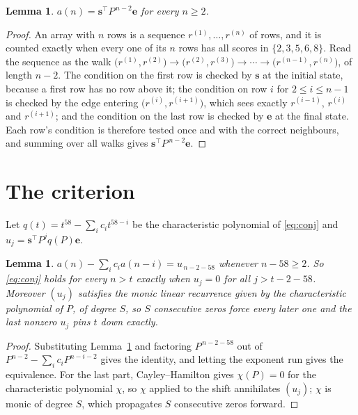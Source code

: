 \documentclass[11pt,a4paper]{article}
\theoremstyle{plain}
\newtheorem{lemma}[theorem]{Lemma}
\theoremstyle{definition}
\begin{document}
\begin{lemma}\label{lem:walk}
$a(n)=\mathbf{s}^{\!\top}P^{\,n-2}\mathbf{e}$ for every $n\ge2$.
\end{lemma}

\begin{proof}
An array with $n$ rows is a sequence $r^{(1)},\dots,r^{(n)}$ of rows, and it is counted
exactly when every one of its $n$ rows has all scores in $\{2,3,5,6,8\}$. Read the sequence as the
walk $\bigl(r^{(1)},r^{(2)}\bigr)\to\bigl(r^{(2)},r^{(3)}\bigr)\to\cdots\to
\bigl(r^{(n-1)},r^{(n)}\bigr)$, of length $n-2$. The condition on the first row is
checked by $\mathbf{s}$ at the initial state, because a first row has no row above it; the
condition on row $i$ for $2\le i\le n-1$ is checked by the edge entering
$\bigl(r^{(i)},r^{(i+1)}\bigr)$, which sees exactly $r^{(i-1)}$, $r^{(i)}$ and
$r^{(i+1)}$; and the condition on the last row is checked by $\mathbf{e}$ at the final
state. Each row's condition is therefore tested once and with the correct neighbours, and
summing over all walks gives $\mathbf{s}^{\!\top}P^{\,n-2}\mathbf{e}$.
\end{proof}

\section{The criterion}

Let $q(t)=t^{58}-\sum_i c_i t^{58-i}$ be the characteristic polynomial of
\eqref{eq:conj} and $u_j=\mathbf{s}^{\!\top}P^{j}q(P)\mathbf{e}$.

\begin{lemma}\label{lem:crit}
$a(n)-\sum_i c_i a(n-i)=u_{\,n-2-58}$ whenever $n-58\ge2$. So \eqref{eq:conj}
holds for every $n>t$ exactly when $u_j=0$ for all $j>t-2-58$. Moreover $(u_j)$
satisfies the monic linear recurrence given by the characteristic polynomial of $P$, of
degree $S$, so $S$ consecutive zeros force every later one and the last nonzero $u_j$ pins
$t$ down exactly.
\end{lemma}

\begin{proof}
Substituting Lemma~\ref{lem:walk} and factoring $P^{\,n-2-58}$ out of
$P^{n-2}-\sum_i c_i P^{n-i-2}$ gives the identity, and letting the exponent run gives the
equivalence. For the last part, Cayley--Hamilton gives $\chi(P)=0$ for the characteristic
polynomial $\chi$, so $\chi$ applied to the shift annihilates $(u_j)$; $\chi$ is monic of
degree $S$, which propagates $S$ consecutive zeros forward.
\end{proof}
\end{document}
